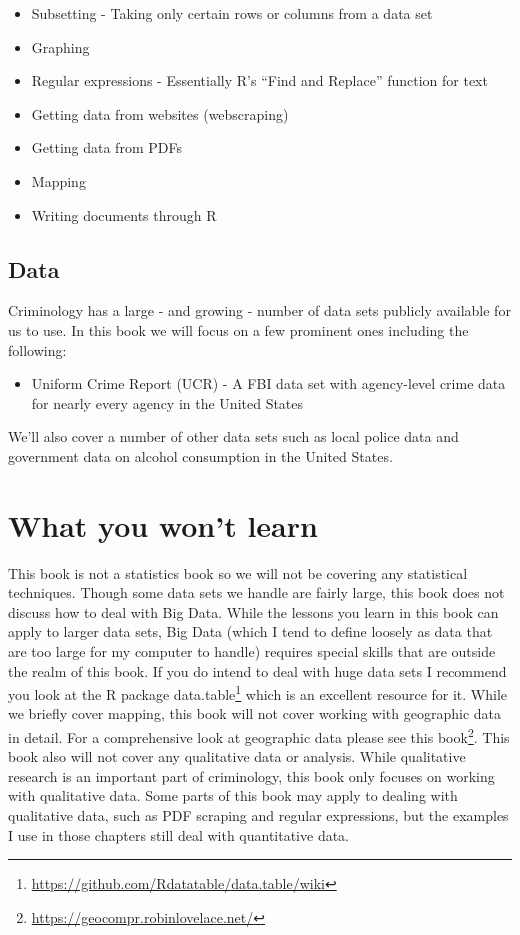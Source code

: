 \documentclass[
]{krantz}
\providecommand{\tightlist}{%
  \setlength{\itemsep}{0pt}\setlength{\parskip}{0pt}}
\renewcommand{\href}[2]{#2\footnote{\url{#1}}}
\begin{document}
\begin{itemize}
\tightlist
\item
  Subsetting - Taking only certain rows or columns from a data set
\item
  Graphing
\item
  Regular expressions - Essentially R's ``Find and Replace'' function for text
\item
  Getting data from websites (webscraping)
\item
  Getting data from PDFs
\item
  Mapping
\item
  Writing documents through R
\end{itemize}

\hypertarget{data}{%
\subsection{Data}\label{data}}

Criminology has a large - and growing - number of data sets publicly available for us to use. In this book we will focus on a few prominent ones including the following:

\begin{itemize}
\tightlist
\item
  Uniform Crime Report (UCR) - A FBI data set with agency-level crime data for nearly every agency in the United States
\end{itemize}

We'll also cover a number of other data sets such as local police data and government data on alcohol consumption in the United States.

\hypertarget{what-you-wont-learn}{%
\section{What you won't learn}\label{what-you-wont-learn}}

This book is not a statistics book so we will not be covering any statistical techniques. Though some data sets we handle are fairly large, this book does not discuss how to deal with Big Data. While the lessons you learn in this book can apply to larger data sets, Big Data (which I tend to define loosely as data that are too large for my computer to handle) requires special skills that are outside the realm of this book. If you do intend to deal with huge data sets I recommend you look at the R package \href{https://github.com/Rdatatable/data.table/wiki}{data.table} which is an excellent resource for it. While we briefly cover mapping, this book will not cover working with geographic data in detail. For a comprehensive look at geographic data please see this \href{https://geocompr.robinlovelace.net/}{book}. This book also will not cover any qualitative data or analysis. While qualitative research is an important part of criminology, this book only focuses on working with qualitative data. Some parts of this book may apply to dealing with qualitative data, such as PDF scraping and regular expressions, but the examples I use in those chapters still deal with quantitative data.
\end{document}
